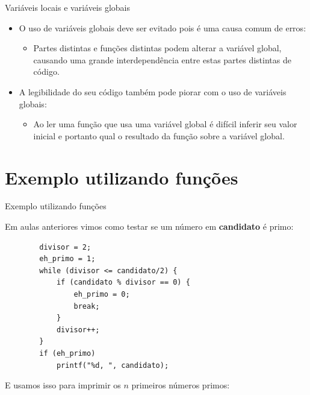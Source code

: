 \documentclass[handout]{beamer}
\begin{document}
\begin{frame}[fragile]{Variáveis locais e variáveis globais}

    \begin{itemize}
        \item O uso de variáveis globais deve ser evitado pois é uma causa comum de erros:
        \begin{itemize}
            \item Partes distintas e funções distintas podem alterar a variável global, causando uma grande interdependência entre estas partes distintas de código.
        \end{itemize}
        \item A legibilidade do seu código também pode piorar com o uso de variáveis globais:
        \begin{itemize}
            \item Ao ler uma função que usa uma variável global é difícil inferir seu valor inicial e portanto qual o resultado da função sobre a variável global.
        \end{itemize}
    \end{itemize}
\end{frame}


\section{Exemplo utilizando funções}

\begin{frame}[fragile]{Exemplo utilizando funções}

    Em aulas anteriores vimos como testar se um número em {\bf candidato} é primo:

    \begin{verbatim}
        divisor = 2;
        eh_primo = 1;
        while (divisor <= candidato/2) {
            if (candidato % divisor == 0) {
                eh_primo = 0;
                break;
            }
            divisor++;
        }
        if (eh_primo)
            printf("%d, ", candidato);
    \end{verbatim} 

    E usamos isso para imprimir os $n$ primeiros números primos:
\end{frame}
\end{document}
